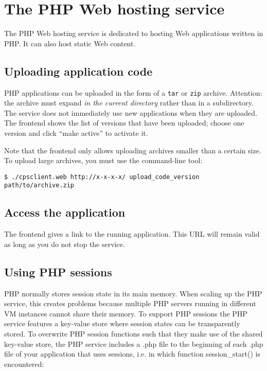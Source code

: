 \documentclass[10pt]{article}
\begin{document}
\section{The PHP Web hosting service}

The PHP Web hosting service is dedicated to hosting Web applications
written in PHP. It can also host static Web content.

\subsection{Uploading application code}

PHP applications can be uploaded in the form of a \texttt{tar} or
\texttt{zip} archive.  Attention: the archive must expand \emph{in the
  current directory} rather than in a subdirectory. The service does
not immediately use new applications when they are uploaded. The
frontend shows the list of versions that have been uploaded; choose
one version and click ``make active'' to activate it.

Note that the frontend only allows uploading archives smaller than a
certain size.  To upload large archives, you must use the command-line
tool:
\begin{verbatim}
$ ./cpsclient.web http://x-x-x-x/ upload_code_version path/to/archive.zip
\end{verbatim}

\subsection{Access the application}

The frontend gives a link to the running application. This URL will
remain valid as long as you do not stop the service.

\subsection{Using PHP sessions}

PHP normally stores session state in its main memory. When scaling up
the PHP service, this creates problems because multiple PHP servers
running in different VM instances cannot share their memory. To
support PHP sessions the PHP service features a key-value store where
session states can be transparently stored. To overwrite PHP session
functions such that they make use of the shared key-value store, the PHP
service includes a .php file to the beginning of each .php file of your
application that uses sessions, i.e. in which function session\_start()
is encountered:
\end{document}
